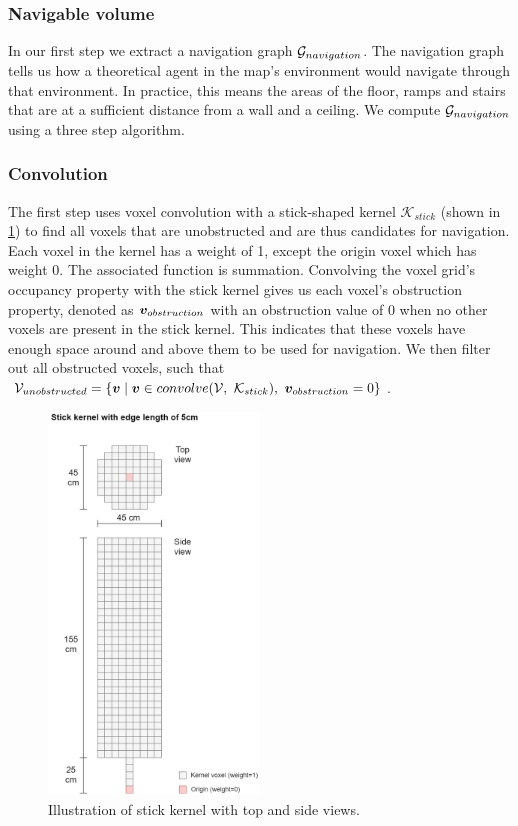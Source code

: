 \subsubsection{Navigable volume}
In our first step we extract a navigation graph \(\mathcal{G}_{navigation}\). The navigation graph tells us how a theoretical agent in the map's environment would navigate through that environment. In practice, this means the areas of the floor, ramps and stairs that are at a sufficient distance from a wall and a ceiling. We compute \(\mathcal{G}_{navigation}\) using a three step algorithm.

\subsubsection{Convolution}
The first step uses voxel convolution with a stick-shaped kernel \(\mathcal{K}_{stick}\) (shown in \ref{fig:stick_kernel}) to find all voxels that are unobstructed and are thus candidates for navigation. Each voxel in the kernel has a weight of 1, except the origin voxel which has weight 0. The associated function is summation. Convolving the voxel grid's occupancy property with the stick kernel gives us each voxel's obstruction property, denoted as \(\boldsymbol{v}_{obstruction}\) with an obstruction value of 0 when no other voxels are present in the stick kernel. This indicates that these voxels have enough space around and above them to be used for navigation. We then filter out all obstructed voxels, such that \(\mathcal{V}_{unobstructed}=\{\boldsymbol{v} \mid \voxel \in convolve(\mathcal{V},\ \mathcal{K}_{stick}),\ \voxel_{obstruction} = 0\}\). 

\begin{figure}[h]
    \centering
    \includegraphics*[width=0.5\textwidth]{./fig/structuring_element.png}
    \caption{Illustration of stick kernel with top and side views.}
    \label{fig:stick_kernel}
\end{figure}

